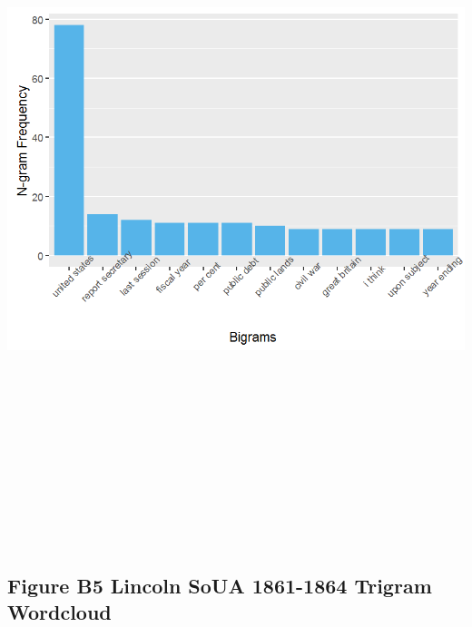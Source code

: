 \documentclass[]{article}
\begin{document}
\includegraphics[height=8.33333in]{images/Lincolndata_bigram_bar.png}

\newpage

\subsection{Figure B5 Lincoln SoUA 1861-1864 Trigram
Wordcloud}\label{figure-b5-lincoln-soua-1861-1864-trigram-wordcloud}
\end{document}
